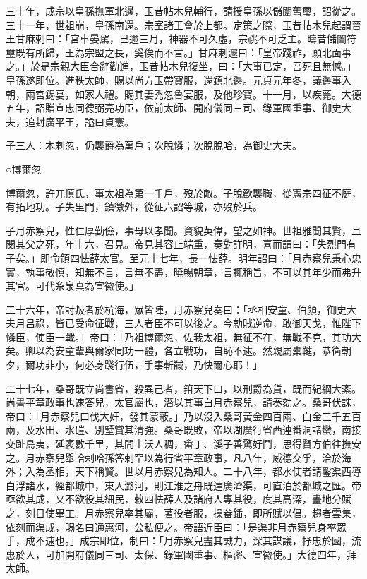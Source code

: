 \begin{pinyinscope}
 三十年，成宗以皇孫撫軍北邊，玉昔帖木兒輔行，請授皇孫以儲闈舊璽，詔從之。三十一年，世祖崩，皇孫南還。宗室諸王會於上都。定策之際，玉昔帖木兒起謂晉王甘麻剌曰：「宮車晏駕，已逾三月，神器不可久虛，宗祧不可乏主。疇昔儲闈符璽既有所歸，王為宗盟之長，奚俟而不言。」甘麻剌遽曰：「皇帝踐祚，願北面事之。」於是宗親大臣合辭勸進，玉昔帖木兒復坐，曰：「大事已定，吾死且無憾。」皇孫遂即位。進秩太師，賜以尚方玉帶寶服，還鎮北邊。元貞元年冬，議邊事入朝，兩宮錫宴，如家人禮。賜其妻禿忽魯宴服，及他珍寶。十一月，以疾薨。大德五年，詔贈宣忠同德弼亮功臣，依前太師、開府儀同三司、錄軍國重事、御史大夫，追封廣平王，謚曰貞憲。



 子三人：木剌忽，仍襲爵為萬戶；次脫憐；次脫脫哈，為御史大夫。



 ○博爾忽



 博爾忽，許兀慎氏，事太祖為第一千戶，歿於敵。子脫歡襲職，從憲宗四征不庭，有拓地功。子失里門，鎮徼外，從征六詔等城，亦歿於兵。



 子月赤察兒，性仁厚勤儉，事母以孝聞。資貌英偉，望之如神。世祖雅聞其賢，且閔其父之死，年十六，召見。帝見其容止端重，奏對詳明，喜而謂曰：「失烈門有子矣。」即命領四怯薛太官。至元十七年，長一怯薛。明年詔曰：「月赤察兒秉心忠實，執事敬慎，知無不言，言無不盡，曉暢朝章，言輒稱旨，不可以其年少而弗升其官。可代糸泉真為宣徽使。」



 二十六年，帝討叛者於杭海，眾皆陣，月赤察兒奏曰：「丞相安童、伯顏，御史大夫月呂祿，皆已受命征戰，三人者臣不可以後之。今勍賊逆命，敢御天戈，惟陛下憐臣，使臣一戰。」帝曰：「乃祖博爾忽，佐我太祖，無征不在，無戰不克，其功大矣。卿以為安童輩與爾家同功一體，各立戰功，自恥不逮。然親屬橐鞬，恭衛朝夕，爾功非小，何必身踐行伍，手事斬馘，乃快爾心耶！」



 二十七年，桑哥既立尚書省，殺異己者，箝天下口，以刑爵為貨，既而紀綱大紊。尚書平章政事也速答兒，太官屬也，潛以其事白月赤察兒，請奏劾之。桑哥伏誅，帝曰：「月赤察兒口伐大奸，發其蒙蔽。」乃以沒入桑哥黃金四百兩、白金三千五百兩，及水田、水磑、別墅賞其清強。桑哥既敗，帝以湖廣行省西連番洞諸蠻，南接交趾島夷，延袤數千里，其間土沃人稠，畬丁、溪子善驚好鬥，思得賢方伯往撫安之。月赤察兒舉哈剌哈孫答剌罕以為行省平章政事，凡八年，威德交孚，洽於海外；入為丞相，天下稱賢。世以月赤察兒為知人。二十八年，都水使者請鑿渠西導白浮諸水，經都城中，東入潞河，則江淮之舟既達廣濟渠，可直泊於都城之匯。帝亟欲其成，又不欲役其細民，敕四怯薛人及諸府人專其役，度其高深，畫地分賦之，刻日使畢工。月赤察兒率其屬，著役者服，操畚鍤，即所賦以倡。趨者雲集，依刻而渠成，賜名曰通惠河，公私便之。帝語近臣曰：「是渠非月赤察兒身率眾手，成不速也。」成宗即位，制曰：「月赤察兒盡其誠力，深其謀議，抒忠於國，流惠於人，可加開府儀同三司、太保、錄軍國重事、樞密、宣徽使。」大德四年，拜太師。




\end{pinyinscope}
